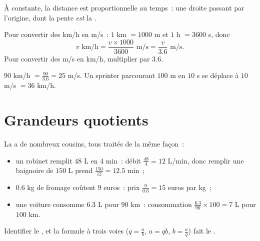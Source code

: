 \begin{omfigure}

{\small À  constante, la distance est proportionnelle au
temps~: une droite passant par l'origine, dont la pente \emph{est} la
.}
\end{omfigure}

\begin{method}\label{met:g8:speed:convert}
Pour convertir des km/h en m/s~: $1$ km $= 1000$ m et $1$ h $= 3600$ s,
donc
\[
v \text{ km/h} = \frac{v \times 1000}{3600} \text{ m/s}
= \frac{v}{3.6} \text{ m/s}.
\]
Pour convertir des m/s en km/h, multiplier par $3.6$.
\end{method}

\begin{example}\label{ex:g8:speed:convert}
$90$ km/h $= \frac{90}{3.6} = 25$ m/s. Un sprinter parcourant $100$ m
en $10$ s se déplace à $10$ m/s $= 36$ km/h.
\end{example}

\section{Grandeurs quotients}

\begin{example}\label{ex:g8:speed:quotients}
La  a de nombreux cousins, tous traités de la même façon~:
\begin{itemize}
  \item un robinet remplit $48$ L en $4$ min~: débit
        $\frac{48}{4} = 12$ L/min, donc remplir une baignoire de
        $150$ L prend $\frac{150}{12} = 12.5$ min~;
  \item $0.6$ kg de fromage coûtent $9$ euros~: prix
        $\frac{9}{0.6} = 15$ euros par kg~;
  \item une voiture consomme $6.3$ L pour $90$ km~: consommation
        $\frac{6.3}{90} \times 100 = 7$ L pour $100$ km.
\end{itemize}
Identifier le , et la formule à trois voies
($q = \frac ab$, $a = qb$, $b = \frac aq$) fait le .
\end{example}

